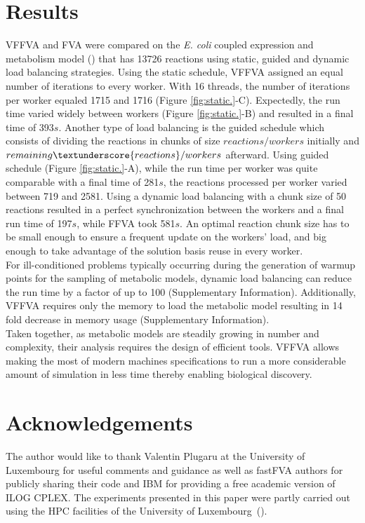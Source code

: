 \documentclass{bioinfo}
\begin{document}
\section{Results}
VFFVA and FVA were compared on the \textit{E. coli} coupled expression and metabolism model (\citealp{thiele2009genome}) that has 13726 reactions using static, guided and dynamic load balancing strategies.
Using the static schedule, VFFVA assigned an equal number of iterations to every worker. With 16 threads, the number of iterations per worker equaled 1715 and 1716 (Figure \ref{fig:static.}-C). Expectedly, the run time varied widely between workers (Figure \ref{fig:static.}-B) and resulted in a final time of 393$s$. Another type of load balancing is the guided schedule which consists of dividing the reactions in chunks of size $reactions/workers$ initially and $remaining\textunderscore{reactions}/workers$ afterward. Using guided schedule (Figure \ref{fig:static.}-A), while the run time per worker was quite comparable with a final time of 281$s$, the reactions processed per worker varied between 719 and 2581.
Using a dynamic load balancing with a chunk size of 50 reactions resulted in a perfect synchronization between the workers and a final run time of 197$s$, while FFVA took 581$s$. An optimal reaction chunk size has to be small enough to ensure a frequent update on the workers' load, and big enough to take advantage of the solution basis reuse in every worker.\\ 
For ill-conditioned problems typically occurring during the generation of warmup points for the sampling of metabolic models, dynamic load balancing can reduce the run time by a factor of up to 100 (Supplementary Information). Additionally, VFFVA requires only the memory to load the metabolic model resulting in 14 fold decrease in memory usage (Supplementary Information). \\
Taken together, as metabolic models are steadily growing in number and complexity, their analysis requires the design of efficient tools. VFFVA allows making the most of modern machines specifications to run a more considerable amount of simulation in less time thereby enabling biological discovery. 


\section*{Acknowledgements}

The author would like to thank Valentin Plugaru at the University of Luxembourg for useful comments and guidance as well as fastFVA authors for publicly sharing their code and IBM for providing a free academic version of ILOG CPLEX. The experiments presented in this paper were partly carried out
using the HPC facilities of the University of Luxembourg~(\citealp{VBCG_HPCS14}).


%
%
%
%
%
%
%

\end{document}
